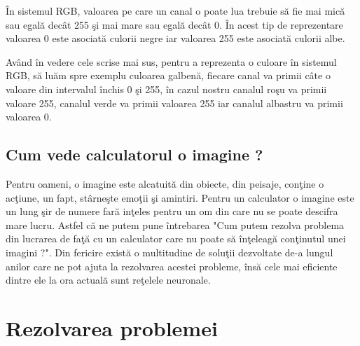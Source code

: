 \par

\^{I}n sistemul RGB, valoarea pe care un canal o poate lua trebuie s\u{a} fie mai mic\u{a} sau egal\u{a} dec\^{a}t 255 \c{s}i mai mare sau egal\u{a} dec\^{a}t 0. \^{I}n acest tip de reprezentare valoarea 0 este asociat\u{a} culorii negre iar valoarea 255 este asociat\u{a} culorii albe. 

\par

Av\^{a}nd \^{i}n vedere cele scrise mai sus, pentru a reprezenta o culoare \^{i}n sistemul RGB, s\u{a} lu\u{a}m spre exemplu culoarea galben\u{a}, fiecare canal va primii c\^{a}te o valoare din intervalul \^{i}nchis 0 \c{s}i 255, \^{i}n cazul nostru canalul ro\c{s}u va primii valoare 255, canalul verde va primii valoarea 255 iar canalul albastru va primii valoarea 0.

\subsection{Cum vede calculatorul o imagine ?}

Pentru oameni, o imagine este alcatuit\u{a} din obiecte, din peisaje, con\c{t}ine o ac\c{t}iune, un fapt, st\^{a}rne\c{s}te emo\c{t}ii \c{s}i amintiri. Pentru un calculator o imagine este un lung \c{s}ir de numere far\u{a} in\c{t}eles pentru un om din care nu se poate descifra mare lucru. Astfel c\u{a} ne putem pune \^{i}ntrebarea "Cum putem rezolva problema din lucrarea de fa\c{t}\u{a} cu un calculator care nu poate s\u{a} \^{i}n\c{t}eleag\u{a} con\c{t}inutul unei imagini ?". Din fericire exist\u{a} o multitudine de solu\c{t}ii dezvoltate de-a lungul anilor care ne pot ajuta la rezolvarea acestei probleme, \^{i}ns\u{a} cele mai eficiente dintre ele la ora actual\u{a} sunt re\c{t}elele neuronale.

\section{Rezolvarea problemei}

